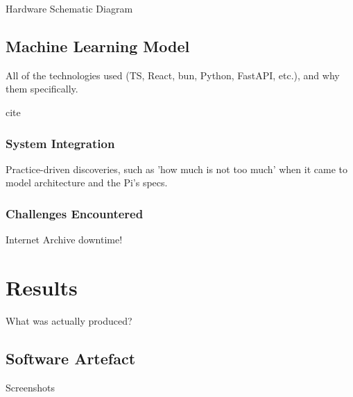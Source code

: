                 \begin{temp}
                    Hardware Schematic Diagram
                \end{temp}
    
      \subsection{Machine Learning Model}
    
            \begin{temp}
                All of the technologies used (TS, React, bun, Python, FastAPI, etc.), and why them specifically.
            \end{temp}
    
            \begin{temp}
                cite \cite{Mitchell_2019}
            \end{temp}
      
            \subsubsection{System Integration}
                \begin{temp}
                    Practice-driven discoveries, such as 'how much is not too much' when it came to model   architecture and the Pi's specs.
                \end{temp}
            
            \subsubsection{Challenges Encountered}
    
                \begin{temp}
                    Internet Archive downtime!
                \end{temp}
    
    
    \section{Results} %
        \begin{temp}
            What was actually produced?
        \end{temp}
        \subsection{Software Artefact}
            \begin{temp}
                Screenshots
            \end{temp}
        
